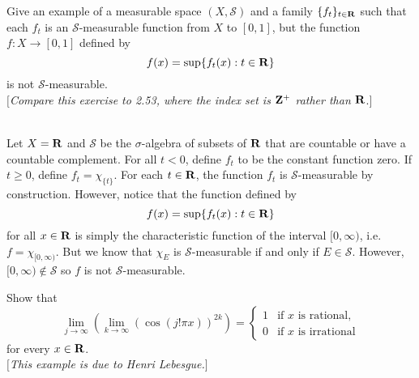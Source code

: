 \begin{exercise}
    Give an example of a measurable space $(X, \mathcal{S})$ and a family $\{f_t\}_{t \in \mathbf{R}}$ such that each $f_t$ is an $\mathcal{S}$-measurable function from $X$ to $[0, 1]$, but the function $f : X \to [0,1]$ defined by 
    $$f(x) = \sup \{f_t(x) : t \in \mathbf{R}\}$$
    is not $\mathcal{S}$-measurable. \\
    $[$\textit{Compare this exercise to 2.53, where the index set is $\mathbf{Z}^+$ rather than $\mathbf{R}$}.$]$\\
\end{exercise}

\begin{solution}
    \\ Let $X = \mathbf{R}$ and $\mathcal{S}$ be the $\sigma$-algebra of subsets of $\mathbf{R}$ that are countable or have a countable complement. For all $t < 0$, define $f_t$ to be the constant function zero. If $t \geq 0$, define $f_t = \chi_{\{t\}}$. For each $t \in \mathbf{R}$, the function $f_t$ is $\mathcal{S}$-measurable by construction. However, notice that the function defined by
    $$f(x) = \sup \{f_t(x) : t \in \mathbf{R}\}$$
    for all $x \in \mathbf{R}$ is simply the characteristic function of the interval $[0, \infty)$, i.e. $f = \chi_{[0, \infty)}$. But we know that $\chi_E$ is $\mathcal{S}$-measurable if and only if $E \in \mathcal{S}$. However, $[0, \infty) \notin \mathcal{S}$ so $f$ is not $\mathcal{S}$-measurable. \\
\end{solution}

\begin{exercise}
    Show that
    $$\lim_{j \rightarrow \infty} \left( \lim_{k \rightarrow \infty} (\cos(j! \pi x))^{2k} \right) = \begin{cases}
        1 & \text{if } x \text{ is rational}, \\
        0 & \text{if } x \text{ is irrational}
    \end{cases}$$
    for every $x \in \mathbf{R}$.\\
    $[$\textit{This example is due to Henri Lebesgue.}$]$ \\
\end{exercise}

